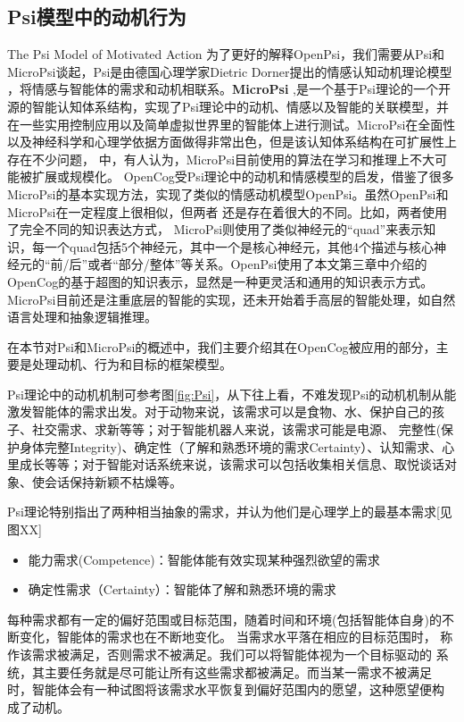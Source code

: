 \subsection{Psi模型中的动机行为}{The Psi Model of Motivated Action}
       为了更好的解释OpenPsi，我们需要从Psi和MicroPsi谈起，Psi是由德国心理学家Dietric Dorner提出的情感认知动机理论模型 \cite{Dorner2002}，将情感与智能体的需求和动机相联系。{\bf MicroPsi} \cite{Bach2009},是一个基于Psi理论的一个开源的智能认知体系结构，实现了Psi理论中的动机、情感以及智能的关联模型，并在一些实用控制应用以及简单虚拟世界里的智能体上进行测试。MicroPsi在全面性以及神经科学和心理学依据方面做得非常出色，但是该认知体系结构在可扩展性上存在不少问题， \cite{EGI1}中，有人认为，MicroPsi目前使用的算法在学习和推理上不大可能被扩展或规模化。
       OpenCog受Psi理论中的动机和情感模型的启发，借鉴了很多MicroPsi的基本实现方法，实现了类似的情感动机模型OpenPsi。虽然OpenPsi和MicroPsi在一定程度上很相似，但两者 还是存在着很大的不同。比如，两者使用了完全不同的知识表达方式， MicroPsi则使用了类似神经元的“quad”来表示知识，每一个quad包括5个神经元，其中一个是核心神经元，其他4个描述与核心神经元的“前/后”或者“部分/整体”等关系。OpenPsi使用了本文第三章中介绍的OpenCog的基于超图的知识表示，显然是一种更灵活和通用的知识表示方式。 MicroPsi目前还是注重底层的智能的实现，还未开始着手高层的智能处理，如自然语言处理和抽象逻辑推理。
       
在本节对Psi和MicroPsi的概述中，我们主要介绍其在OpenCog被应用的部分，主要是处理动机、行为和目标的框架模型。

Psi理论中的动机机制可参考图\ref{fig:Psi}，从下往上看，不难发现Psi的动机机制从能激发智能体的需求出发。对于动物来说，该需求可以是食物、水、保护自己的孩子、社交需求、求新等等；对于智能机器人来说，该需求可能是电源、 完整性(保护身体完整Integrity)、确定性（了解和熟悉环境的需求Certainty）、认知需求、心里成长等等；对于智能对话系统来说，该需求可以包括收集相关信息、取悦谈话对象、使会话保持新颖不枯燥等。

Psi理论特别指出了两种相当抽象的需求，并认为他们是心理学上的最基本需求[见图XX]


\begin{itemize}
\item 能力需求(Competence)：智能体能有效实现某种强烈欲望的需求
\item 确定性需求（Certainty）：智能体了解和熟悉环境的需求
\end{itemize}

每种需求都有一定的偏好范围或目标范围，随着时间和环境(包括智能体自身)的不断变化，智能体的需求也在不断地变化。 当需求水平落在相应的目标范围时，
称作该需求被满足，否则需求不被满足。我们可以将智能体视为一个目标驱动的
系统，其主要任务就是尽可能让所有这些需求都被满足。而当某一需求不被满足
时，智能体会有一种试图将该需求水平恢复到偏好范围内的愿望，这种愿望便构
成了动机。

